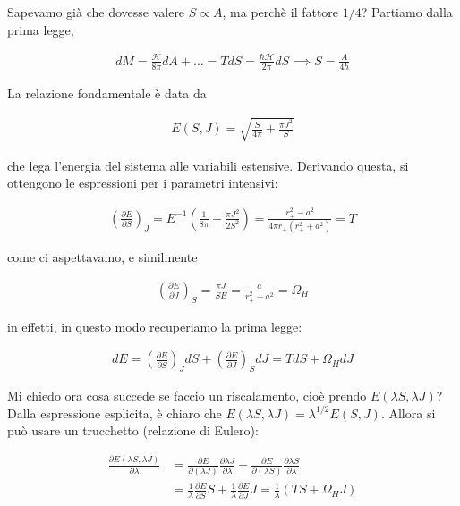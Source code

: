 \documentclass{report}
\begin{document}
Sapevamo già che dovesse valere \(S \propto A\), ma perchè il fattore \(1/4\)? Partiamo dalla prima legge, 

\begin{align}
    dM = \frac{\mathcal{H}}{8\pi}dA + \ldots = TdS = \frac{\hbar \mathcal{H}}{2\pi}dS \implies S = \frac{A}{4\hbar}
\end{align}

La relazione fondamentale è data da

\begin{align}
    E(S, J) = \sqrt{\frac{S}{4\pi} + \frac{\pi J^2}{S}} 
\end{align}

che lega l'energia del sistema alle variabili estensive. Derivando questa, si ottengono le espressioni per i parametri intensivi: 

\begin{align}
    \left(\frac{\partial E}{\partial S} \right)_J = E^{-1}\left(\frac{1}{8\pi} - \frac{\pi J^2}{2S^2} \right) = \frac{r^2_+ - a^2}{4\pi r_+ (r_+^2 + a^2)} = T
\end{align}

come ci aspettavamo, e similmente 

\begin{align}
    \left(\frac{\partial E}{\partial J} \right)_S = \frac{\pi J}{SE} = \frac{a}{r^2_+ + a^2} = \Omega_H
\end{align}

in effetti, in questo modo recuperiamo la prima legge: 

\begin{align}
    dE = \left(\frac{\partial E}{\partial S}\right)_J dS + \left(\frac{\partial E}{\partial J}\right)_S dJ = TdS + \Omega_H dJ 
\end{align}

Mi chiedo ora cosa succede se faccio un riscalamento, cioè prendo \(E(\lambda S, \lambda J)\)? Dalla espressione esplicita, è chiaro che \(E(\lambda S, \lambda J) = \lambda^{1/2}E(S, J)\). Allora si può usare un trucchetto (relazione di Eulero): 

\begin{align}
    \frac{\partial E(\lambda S, \lambda J)}{\partial \lambda} &= \frac{\partial E}{\partial (\lambda J)}\frac{\partial \lambda J}{\partial \lambda} + \frac{\partial E}{\partial (\lambda S)}\frac{\partial \lambda S}{\partial \lambda} \\
    &= \frac{1}{\lambda}\frac{\partial E}{\partial S} S + \frac{1}{\lambda}\frac{\partial E}{\partial J} J = \frac{1}{\lambda}(TS + \Omega_H J)
\end{align}
\end{document}
